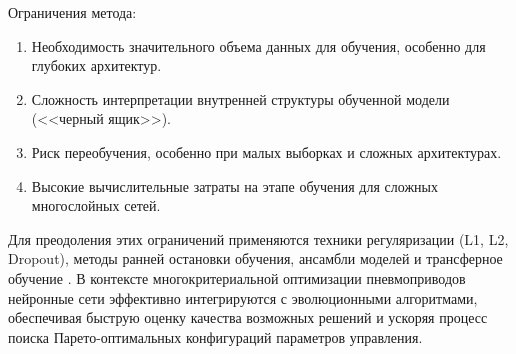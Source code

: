 Ограничения метода:

\begin{enumerate}
    \item Необходимость значительного объема данных для обучения, особенно для глубоких архитектур.
    \item Сложность интерпретации внутренней структуры обученной модели (<<черный ящик>>).
    \item Риск переобучения, особенно при малых выборках и сложных архитектурах.
    \item Высокие вычислительные затраты на этапе обучения для сложных многослойных сетей.
\end{enumerate}

Для преодоления этих ограничений применяются техники регуляризации (L1, L2, Dropout), методы ранней остановки обучения,
ансамбли моделей и трансферное обучение \cite{Farhadi2022Combining}. В контексте многокритериальной оптимизации пневмоприводов
нейронные сети эффективно интегрируются с эволюционными алгоритмами, обеспечивая быструю оценку качества возможных решений
и ускоряя процесс поиска Парето-оптимальных конфигураций параметров управления.

